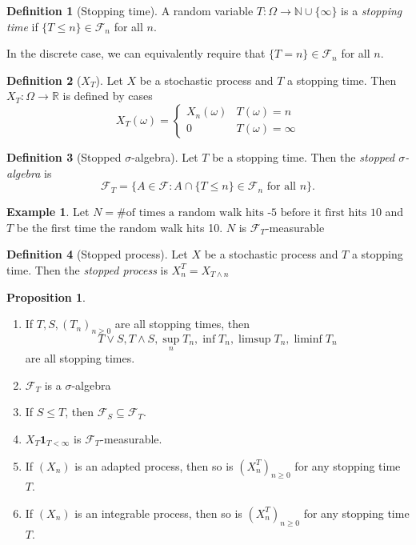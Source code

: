 \documentclass[parskip=full]{article}
\theoremstyle{definition}
\newtheorem*{definition}{Definition}
\newtheorem{proposition}{Proposition}[section]
\newtheorem*{example}{Example}
\newcommand{\R}{\mathbb{R}}
\newcommand{\1}{\mathbbm{1}}
\begin{document}
\begin{definition}[Stopping time]
  A random variable $T: \Omega \to \mathbb{N} \cup \{\infty\}$ is a \emph{stopping time} if $\{T \leq n\} \in \mathcal{F}_n$ for all $n$.
\end{definition}
In the discrete case, we can equivalently require that $\{T = n\} \in \mathcal{F}_n$ for all $n$.
\begin{definition}[$X_T$]
  Let $X$ be a stochastic process and $T$ a stopping time. Then $X_T: \Omega \to \R$ is defined by cases
  \[
    X_T(\omega) = \begin{cases}
      X_n(\omega) & T(\omega) = n      \\
      0           & T(\omega) = \infty
    \end{cases}
  \]
\end{definition}

\begin{definition}[Stopped $\sigma$-algebra]
  Let $T$ be a stopping time. Then the \emph{stopped $\sigma$-algebra} is
  \[
    \mathcal{F}_T = \{A \in \mathcal{F}: A \cap \{T \leq n\} \in \mathcal{F}_n \text{ for all } n\}.
  \]
\end{definition}

\begin{example}
  Let $N=\text{\# of times a random walk hits -5 before it first hits 10}$ and $T$ be the first time the random walk hits 10. $N$ is $\mathcal{F}_T$-measurable
\end{example}

\begin{definition}[Stopped process]
  Let $X$ be a stochastic process and $T$ a stopping time. Then the \emph{stopped process} is $X^T_n = X_{T \wedge n}$
\end{definition}

\begin{proposition}
  $ $
  \begin{enumerate}
    \item If $T, S, (T_n)_{n \geq 0}$ are all stopping times, then
          \[
            T \vee S, T \wedge S, \sup_n T_n, \inf T_n, \limsup T_n, \liminf T_n
          \]
          are all stopping times.
    \item $\mathcal{F}_T$ is a $\sigma$-algebra
    \item If $S \leq T$, then $\mathcal{F}_S \subseteq \mathcal{F}_T$.
    \item $X_T \mathbf{1}_{T < \infty}$ is $\mathcal{F}_T$-measurable.
    \item If $(X_n)$ is an adapted process, then so is $(X^T_n)_{n \geq 0}$ for any stopping time $T$.
    \item If $(X_n)$ is an integrable process, then so is $(X^T_n)_{n \geq 0}$ for any stopping time $T$.
  \end{enumerate}
\end{proposition}
\end{document}
